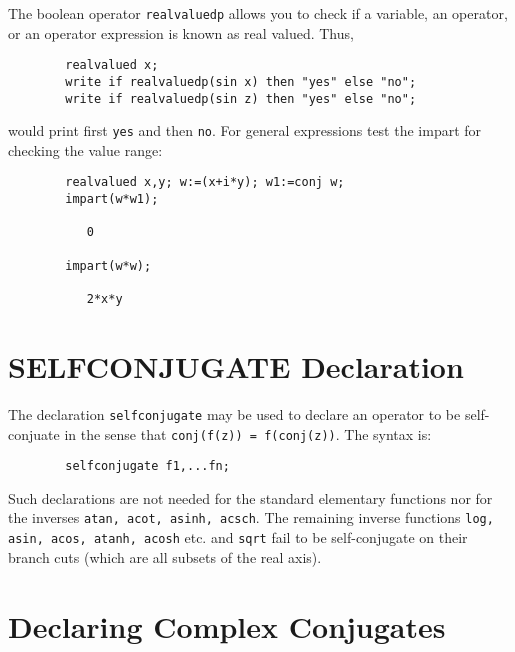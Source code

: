 \hypertarget{operator:REALVALUEDP}{}
The boolean operator \texttt{realvaluedp}
allows you to check if a variable, an operator, or
an operator expression is known as real valued.
Thus, 
\begin{verbatim}
        realvalued x;
        write if realvaluedp(sin x) then "yes" else "no";
        write if realvaluedp(sin z) then "yes" else "no";
\end{verbatim}
would print first \texttt{yes} and then \texttt{no}. For general
expressions test the impart for checking the value range:
\begin{verbatim}
        realvalued x,y; w:=(x+i*y); w1:=conj w;
        impart(w*w1);

           0

        impart(w*w);

           2*x*y
\end{verbatim}

\section{SELFCONJUGATE Declaration}
\hypertarget{command:SELFCONJUGATE}{}

The declaration \texttt{selfconjugate}
may be used 
to declare an operator to be self-conjuate in the sense that
\texttt{conj(f(z)) = f(conj(z))}. The syntax is:
\begin{verbatim}
        selfconjugate f1,...fn;
\end{verbatim}

Such declarations are not needed for the standard elementary functions nor
for the inverses \texttt{atan, acot, asinh, acsch}. The remaining inverse
functions \texttt{log, asin, acos, atanh, acosh} etc. and
\texttt{sqrt} fail to be self-conjugate on their branch cuts (which are all
subsets of the real axis).

\section{Declaring Complex Conjugates}

